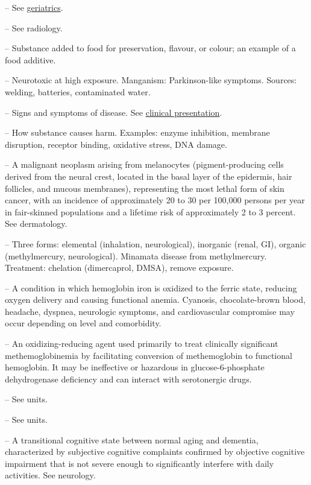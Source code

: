 -- See \hyperlink{Geriatrics}{geriatrics}.

-- See radiology.

-- Substance added to food for preservation, flavour, or colour; an example of a food additive.

-- Neurotoxic at high exposure. Manganism: Parkinson-like symptoms. Sources: welding, batteries, contaminated water.

-- Signs and symptoms of disease. See \hyperlink{Clinical Presentation}{clinical presentation}.

-- How substance causes harm. Examples: enzyme inhibition, membrane disruption, receptor binding, oxidative stress, DNA damage.

-- A malignant neoplasm arising from melanocytes (pigment-producing cells derived from the neural crest, located in the basal layer of the epidermis, hair follicles, and mucous membranes), representing the most lethal form of skin cancer, with an incidence of approximately 20 to 30 per 100,000 persons per year in fair-skinned populations and a lifetime risk of approximately 2 to 3 percent. See dermatology.

-- Three forms: elemental (inhalation, neurological), inorganic (renal, GI), organic (methylmercury, neurological). Minamata disease from methylmercury. Treatment: chelation (dimercaprol, DMSA), remove exposure.

-- A condition in which hemoglobin iron is oxidized to the ferric state, reducing oxygen delivery and causing functional anemia. Cyanosis, chocolate-brown blood, headache, dyspnea, neurologic symptoms, and cardiovascular compromise may occur depending on level and comorbidity.

-- An oxidizing-reducing agent used primarily to treat clinically significant methemoglobinemia by facilitating conversion of methemoglobin to functional hemoglobin. It may be ineffective or hazardous in glucose-6-phosphate dehydrogenase deficiency and can interact with serotonergic drugs.

-- See units.

-- See units.

-- A transitional cognitive state between normal aging and dementia, characterized by subjective cognitive complaints confirmed by objective cognitive impairment that is not severe enough to significantly interfere with daily activities. See neurology.

